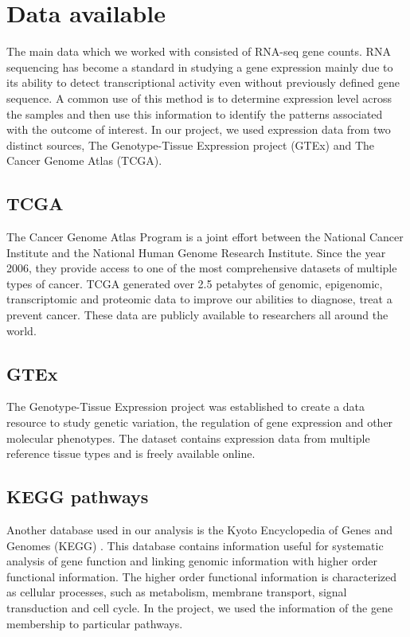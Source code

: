 \newpage
\section{Data available}
The main data which we worked with consisted of RNA-seq gene counts.
RNA sequencing has become a standard in studying a gene expression mainly due to its ability to detect transcriptional activity even without previously defined gene sequence\cite{nellore2016rail}.
A common use of this method is to determine expression level across the samples and then use this information to identify the patterns associated with the outcome of interest.
In our project, we used expression data from two distinct sources, The Genotype-Tissue Expression project (GTEx)\cite{lonsdale2013genotype} and The Cancer Genome Atlas (TCGA)\cite{tcga}.

\subsection{TCGA}
The Cancer Genome Atlas Program is a joint effort between the National Cancer Institute and the National Human Genome Research Institute.
Since the year 2006, they provide access to one of the most comprehensive datasets of multiple types of cancer.
TCGA generated over 2.5 petabytes of genomic, epigenomic, transcriptomic and proteomic data to improve our abilities to diagnose, treat a prevent cancer.
These data are publicly available to researchers all around the world.

\subsection{GTEx}
The Genotype-Tissue Expression project was established to create a data resource to study genetic variation, the regulation of gene expression and other molecular phenotypes.
The dataset contains expression data from multiple reference tissue types and is freely available online.

\subsection{KEGG pathways}
Another database used in our analysis is the Kyoto Encyclopedia of Genes and Genomes (KEGG) \cite{kanehisa2000kegg}.
This database contains information useful for systematic analysis of gene function and linking genomic information with higher order functional information.
The higher order functional information is characterized as cellular processes, such as metabolism, membrane transport, signal transduction and cell cycle.
In the project, we used the information of the gene membership to particular pathways.
\label{subsec:kegg}

